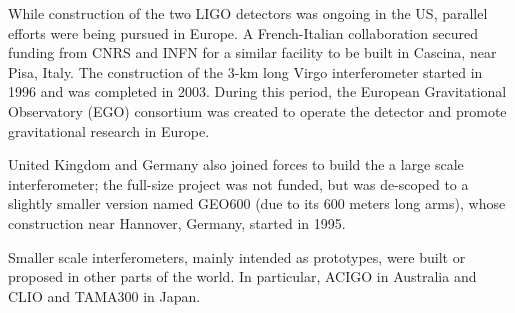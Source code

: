 While construction of the two LIGO detectors was ongoing in the US, parallel efforts 
were being pursued in Europe. A French-Italian collaboration secured funding from CNRS and INFN for a 
similar facility to be built in Cascina, near Pisa, Italy.
The construction of the 3-km long Virgo interferometer started in 1996 and was completed in 2003.
During this period, the European Gravitational Observatory (EGO) consortium was created to operate the detector 
and promote gravitational research in Europe.

United Kingdom and Germany also joined forces to build the a large scale interferometer; the full-size project was not funded, but was de-scoped to a slightly smaller version named GEO600 (due to its 600 meters long arms), 
whose construction near Hannover, Germany, started in 1995.

Smaller scale interferometers, mainly intended as prototypes, were built or 
proposed in other parts of the world. In particular, ACIGO in Australia and 
CLIO and TAMA300 in Japan.

